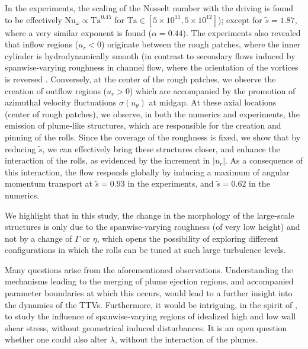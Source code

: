 In the experiments, the scaling of the Nusselt number with the driving is found to be effectively $\text{Nu}_\omega\propto \text{Ta}^{0.45}$ for $\text{Ta}\in[5\times 10^{11},5\times 10^{12}]$); except for $\tilde{s}=1.87$, where a very similar exponent is found ($\alpha=0.44$). The experiments also revealed that inflow regions ($u_r<0$) originate between the rough patches, where the inner cylinder is hydrodynamically smooth (in contrast to secondary flows induced by spanwise-varying roughness in channel flow, where the orientation of the vortices is reversed \citep{Chung2018}. Conversely, at the center of the rough patches, we observe the creation of outflow regions ($u_r>0$) which are accompanied by the promotion of azimuthal velocity fluctuations $\sigma(u_\theta)$ at midgap. At these axial locations (center of rough patches), we observe, in both the numerics and experiments, the emission of plume-like structures, which are responsible for the creation and pinning of the rolls. Since the coverage of the roughness is fixed, we show that by reducing $\tilde{s}$, we can effectively bring these structures closer, and enhance the interaction of the rolls, as evidenced by the increment in $|u_r|$. As a consequence of this interaction, the flow responds globally by inducing a maximum of angular momentum transport at $\tilde{s}=0.93$ in the experiments, and $\tilde{s}=0.62$ in the numerics.  

We highlight that in this study, the change in the morphology of the large-scale structures is only due to the spanwise-varying roughness (of very low height) and not by a change of $\Gamma$ or $\eta$, which opens the possibility of exploring different configurations in which the rolls can be tuned at such large turbulence levels. 
 
Many questions arise from the aforementioned observations. Understanding the mechanisms leading to the merging of plume ejection regions, and accompanied parameter boundaries at which this occurs, would lead to a further insight into the dynamics of the TTVs. Furthermore, it would be intriguing, in the spirit of \citet{Bakhuis2018b}, to study the influence of spanwise-varying regions of idealized high and low wall shear stress, without geometrical induced disturbances. It is an open question whether one could also alter $\lambda$, without the interaction of the plumes.



\graphicspath{{fig/}}
